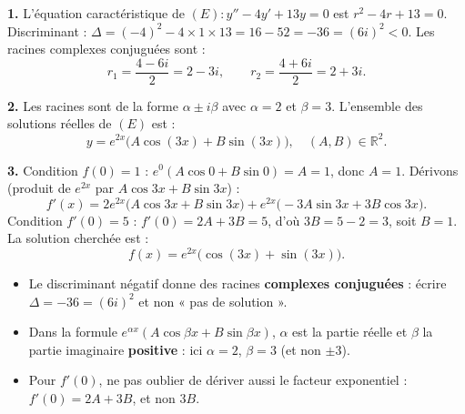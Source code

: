\documentclass[11pt]{article}
\begin{document}
\begin{corrige}
\textbf{1.} L'équation caractéristique de $(E) : y'' - 4y' + 13y = 0$ est $r^2 - 4r + 13 = 0$.
Discriminant : $\Delta = (-4)^2 - 4 \times 1 \times 13 = 16 - 52 = -36 = (6i)^2 < 0$.
Les racines complexes conjuguées sont :
\[ r_1 = \frac{4 - 6i}{2} = 2 - 3i, \qquad r_2 = \frac{4 + 6i}{2} = 2 + 3i. \]

\textbf{2.} Les racines sont de la forme $\alpha \pm i\beta$ avec $\alpha = 2$ et $\beta = 3$. L'ensemble des solutions réelles de $(E)$ est :
\[ \boxed{y = e^{2x}\bigl(A\cos(3x) + B\sin(3x)\bigr),\quad (A, B) \in \mathbb{R}^2.} \]

\textbf{3.} Condition $f(0) = 1$ : $e^{0}(A\cos 0 + B\sin 0) = A = 1$, donc $A = 1$.
Dérivons (produit de $e^{2x}$ par $A\cos 3x + B\sin 3x$) :
\[ f'(x) = 2e^{2x}\bigl(A\cos 3x + B\sin 3x\bigr) + e^{2x}\bigl(-3A\sin 3x + 3B\cos 3x\bigr). \]
Condition $f'(0) = 5$ : $f'(0) = 2A + 3B = 5$, d'où $3B = 5 - 2 = 3$, soit $B = 1$.
La solution cherchée est :
\[ \boxed{f(x) = e^{2x}\bigl(\cos(3x) + \sin(3x)\bigr).} \]

\begin{attention}
\begin{itemize}
\item Le discriminant négatif donne des racines \textbf{complexes conjuguées} : écrire $\Delta = -36 = (6i)^2$ et non « pas de solution ».
\item Dans la formule $e^{\alpha x}(A\cos\beta x + B\sin\beta x)$, $\alpha$ est la partie réelle et $\beta$ la partie imaginaire \textbf{positive} : ici $\alpha = 2$, $\beta = 3$ (et non $\pm 3$).
\item Pour $f'(0)$, ne pas oublier de dériver aussi le facteur exponentiel : $f'(0) = 2A + 3B$, et non $3B$.
\end{itemize}
\end{attention}
\end{corrige}
\end{document}
